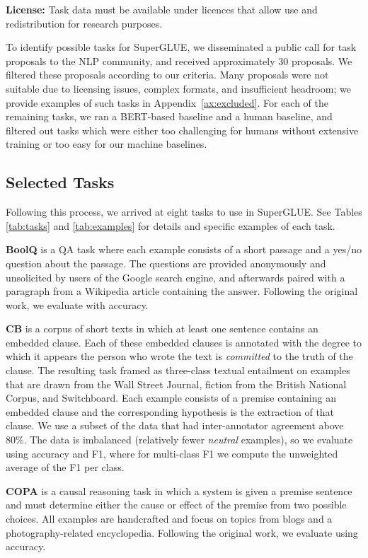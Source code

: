 \textbf{License:} Task data must be available under licences that allow use and redistribution for research purposes.

To identify possible tasks for SuperGLUE, we disseminated a public call for task proposals to the NLP community, and received approximately 30 proposals.
We filtered these proposals according to our criteria.
Many proposals were not suitable due to licensing issues, complex formats, and insufficient headroom;
we provide examples of such tasks in Appendix~\ref{ax:excluded}. For each of the remaining tasks, we ran a BERT-based baseline and a human baseline, and filtered out tasks which were either too challenging for humans without extensive training or too easy for our machine baselines. 

\subsection{Selected Tasks}
Following this process, we arrived at eight tasks to use in SuperGLUE. See Tables \ref{tab:tasks} and \ref{tab:examples} for details and specific examples of each task.
 
\textbf{BoolQ} \citep[Boolean Questions,][]{clark2019boolq} is a QA task where each example consists of a short passage and a yes/no question about the passage. The questions are provided anonymously and unsolicited by users of the Google search engine, and afterwards paired with a paragraph from a Wikipedia article containing the answer. Following the original work, we evaluate with accuracy.

\textbf{CB} \citep[CommitmentBank,][]{demarneffe:cb} is a 
corpus of short texts in which at least one sentence contains an embedded clause. 
Each of these embedded clauses is annotated with the degree to which it appears the person who wrote the text is \textit{committed} to the truth of the clause. The resulting task framed as three-class textual entailment on examples that are drawn from the Wall Street Journal, fiction from the British National Corpus, and Switchboard.
Each example consists of a premise containing an embedded clause and the corresponding hypothesis is the extraction of that clause. 
We use a subset of the data that had inter-annotator agreement above $80\%$.
The data is imbalanced (relatively fewer \textit{neutral} examples), so we evaluate using accuracy and F1, where for multi-class F1 we compute the unweighted average of the F1 per class.

\textbf{COPA} \citep[Choice of Plausible Alternatives,][]{roemmele2011choice} is a causal reasoning task in which a system is given a premise sentence and must determine either the cause or effect of the premise from two possible choices. 
All examples are handcrafted and focus on topics from blogs and a photography-related encyclopedia. Following the original work, we evaluate using accuracy.

